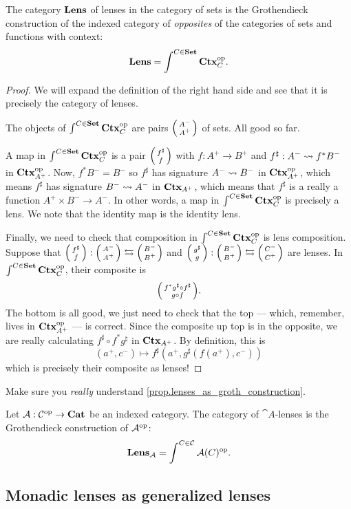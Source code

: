 \documentclass[DynamicalBook]{subfiles}
\begin{document}
\begin{proposition}\label{prop.lenses_as_groth_construction}
  The category $\textbf{Lens}$ of lenses in the category of sets is the
  Grothendieck construction of the indexed category of \emph{opposites} of the
  categories of sets and functions with context:
  $$\textbf{Lens} = \int^{C \in \textbf{Set}} \textbf{Ctx}_{C}^{\textnormal{op}}.$$
\end{proposition}
\begin{proof}
We will expand the
definition of the right hand side and see that it is precisely the category of lenses.

The objects of $\int^{C \in \textbf{Set}} \textbf{Ctx}_{C}^{\textnormal{op}}$ are pairs $\lens{A^-}{A^+}$ of
sets. All good so far.

A map in $\int^{C \in \textbf{Set}} \textbf{Ctx}_{C}^{\textnormal{op}}$ is a pair $\lens{f^{\sharp}}{f}$
with $f : A^+ \to B^+$ and $f^{\sharp} : A^- \rightsquigarrow f^{\ast} B^-$ in
$\textbf{Ctx}_{A^+}^{\textnormal{op}}$. Now, $f^{\ast}B^- = B^-$ so $f^{\sharp}$ has signature $A^-
\rightsquigarrow B^-$ in $\textbf{Ctx}_{A^+}^{\textnormal{op}}$, which means $f^{\sharp}$ has signature $B^-
\rightsquigarrow A^{-}$ in $\textbf{Ctx}_{A^+}$, which means that $f^{\sharp}$ is a really a
function $A^+ \times B^- \to A^{-}$. In other words, a map in $\int^{C \in \textbf{Set}}
\textbf{Ctx}_{C}^{\textnormal{op}}$ is precisely a lens. We note that the identity map is the identity lens.

Finally, we need to check that composition in $\int^{C \in \textbf{Set}} \textbf{Ctx}_{C}^{\textnormal{op}}$
is lens composition. Suppose that $\lens{f^{\sharp}}{f} :
  \lens{A^-}{A^+} \fromto \lens{B^-}{B^+}$ and $\lens{g^{\sharp}}{g} :
  \lens{B^-}{B^+} \fromto \lens{C^-}{C^+}$ are lenses. In $\int^{C \in \textbf{Set}}
  \textbf{Ctx}_{C}^{\textnormal{op}}$, their composite is
$$\lens{f^{\ast}g^{\sharp} \circ f^{\sharp}}{g \circ f}.$$
  The bottom is all good, we just need to check that the top --- which,
  remember, lives in $\textbf{Ctx}_{A^+}^{\textnormal{op}}$ --- is correct. Since the composite up top
  is in
  the opposite, we are really calculating $f^{\sharp} \circ f^{\ast} g^{\sharp}$
  in $\textbf{Ctx}_{A^+}$. By definition, this is
$$(a^+, c^-) \mapsto f^{\sharp}(a^+, g^{\sharp}(f(a^+), c^-))$$
which is precisely their composite as lenses!
\end{proof}

\begin{exercise}\label{ex.really_understand_charts_as_groth_construction}
  Make sure you \emph{really} understand \cref{prop.lenses_as_groth_construction}.
\end{exercise}

\begin{definition}
 Let $\mathcal{A} : \mathcal{C}^{\textnormal{op}} \to \textbf{Cat}$ be an indexed category. The category of $\cat{A}$-lenses is the Grothendieck construction of
     $\mathcal{A}^{\textnormal{op}}$:
$$\textbf{Lens}_{\mathcal{A}} = \int^{C \in \mathcal{C}} \mathcal{A}(C)^{\textnormal{op}}.$$
\end{definition}

\subsection{Monadic lenses as generalized lenses}
\end{document}
